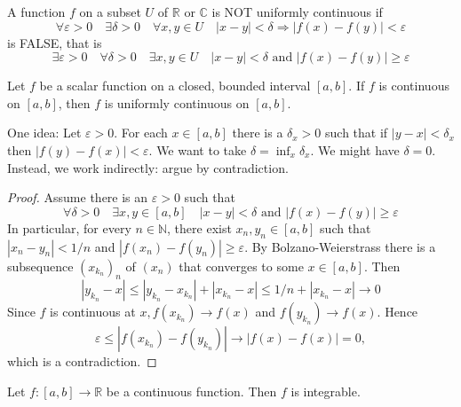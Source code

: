 \documentclass[a4paper,11pt]{article}
\begin{document}
\begin{note}
    A function $f$ on a subset $U$ of $\mathbb{R}$ or $\mathbb{C}$ is NOT uniformly continuous if
    \[
        \forall \varepsilon>0 \quad \exists \delta>0 \quad \forall x, y \in U \quad|x-y|<\delta \Longrightarrow|f(x)-f(y)|<\varepsilon
    \]
    is FALSE, that is
    \[
        \exists \varepsilon>0 \quad \forall \delta>0 \quad \exists x, y \in U \quad|x-y|<\delta \text{ and }|f(x)-f(y)| \geqslant \varepsilon
    \]
\end{note}
\begin{theorem}\label{thm:9}
    Let $f$ be a scalar function on a closed, bounded interval $[a, b]$. If $f$ is continuous on $[a, b]$, then $f$ is uniformly continuous on $[a, b]$. 
\end{theorem}
One idea: Let $\varepsilon>0$. For each $x \in[a, b]$ there is a $\delta_{x}>0$ such that if $|y-x|<\delta_{x}$ then $|f(y)-f(x)|<\varepsilon$. We want to take $\delta=\inf _{x} \delta_{x} .$ We might have $\delta=0$. Instead, we work indirectly: argue by contradiction.
\begin{proof}
    Assume there is an $\varepsilon>0$ such that
    \[
        \forall \delta>0 \quad \exists x, y \in[a, b] \quad|x-y|<\delta \text{ and }|f(x)-f(y)| \geqslant \varepsilon
    \]
    In particular, for every $n \in \mathbb{N}$, there exist $x_{n}, y_{n} \in[a, b]$ such that $\left|x_{n}-y_{n}\right|<1 / n$ and $\left|f\left(x_{n}\right)-f\left(y_{n}\right)\right| \geqslant \varepsilon$. By Bolzano-Weierstrass there is a subsequence $\left(x_{k_{n}}\right)_{n}$ of $\left(x_{n}\right)$ that converges to some $x \in[a, b]$. Then
    \[
    \left|y_{k_{n}}-x\right| \leqslant\left|y_{k_{n}}-x_{k_{n}}\right|+\left|x_{k_{n}}-x\right| \leqslant 1 / n+\left|x_{k_{n}}-x\right| \rightarrow 0
    \]
    Since $f$ is continuous at $x, f\left(x_{k_{n}}\right) \rightarrow f(x)$ and $f\left(y_{k_{n}}\right) \rightarrow f(x)$. Hence 
    \[
        \varepsilon \leqslant\left|f\left(x_{k_{n}}\right)-f\left(y_{k_{n}}\right)\right| \rightarrow|f(x)-f(x)|=0,
    \]
    which is a contradiction.
\end{proof}
\begin{corollary}\label{col:10}
    Let $f:[a, b] \rightarrow \mathbb{R}$ be a continuous function. Then $f$ is integrable.
\end{corollary}
\end{document}
